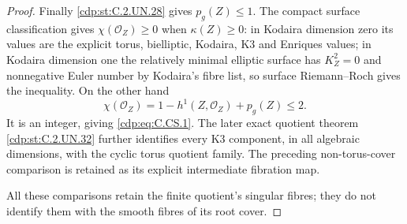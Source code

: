 \begin{proof}
Finally \ref{cdp:st:C.2.UN.28} gives $p_g(Z)\le1$.
The compact surface classification
gives $\chi(\mathcal O_Z)\ge0$ when
$\kappa(Z)\ge0$: in Kodaira dimension
zero its values are the explicit
torus, bielliptic, Kodaira, K3 and
Enriques values; in Kodaira dimension
one the relatively minimal elliptic
surface has $K_Z^2=0$ and nonnegative
Euler number by Kodaira's fibre list,
so surface Riemann--Roch gives the
inequality. On the other hand
\[
        \chi(\mathcal O_Z)=1-h^1(Z,\mathcal O_Z)+p_g(Z)
                              \le2.
                                                               \tag{C.CS.6}\label{cdp:eq:C.CS.6}
\]
It is an integer, giving \eqref{cdp:eq:C.CS.1}.
The later exact quotient theorem
\ref{cdp:st:C.2.UN.32} further identifies every K3
component, in all algebraic dimensions,
with the cyclic torus quotient family.
The preceding non-torus-cover comparison
is retained as its explicit intermediate
fibration map.

All these comparisons retain the
finite quotient's singular fibres;
they do not identify them with the
smooth fibres of its root cover.
\end{proof}


